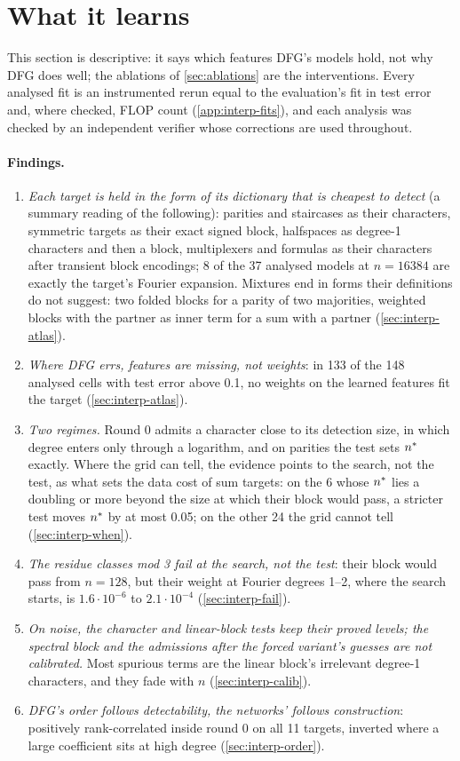 \section{What it learns}\label{sec:interp}

This section is descriptive: it says which features DFG's models hold, not why DFG does well; the ablations of \cref{sec:ablations} are the interventions. Every analysed fit is an instrumented rerun equal to the evaluation's fit in test error and, where checked, FLOP count (\cref{app:interp-fits}), and each analysis was checked by an independent verifier whose corrections are used throughout.

\paragraph{Findings.}
\begin{enumerate}
\item \emph{Each target is held in the form of its dictionary that is cheapest to detect} (a summary reading of the following): parities and staircases as their characters, symmetric targets as their exact signed block, halfspaces as degree-1 characters and then a block, multiplexers and formulas as their characters after transient block encodings; 8 of the 37 analysed models at $n=16384$ are exactly the target's Fourier expansion. Mixtures end in forms their definitions do not suggest: two folded blocks for a parity of two majorities, weighted blocks with the partner as inner term for a sum with a partner (\cref{sec:interp-atlas}).
\item \emph{Where DFG errs, features are missing, not weights}: in 133 of the 148 analysed cells with test error above 0.1, no weights on the learned features fit the target (\cref{sec:interp-atlas}).
\item \emph{Two regimes.} Round 0 admits a character close to its detection size, in which degree enters only through a logarithm, and on parities the test sets $n^{*}$ exactly. Where the grid can tell, the evidence points to the search, not the test, as what sets the data cost of sum targets: on the 6 whose $n^{*}$ lies a doubling or more beyond the size at which their block would pass, a stricter test moves $n^{*}$ by at most 0.05; on the other 24 the grid cannot tell (\cref{sec:interp-when}).
\item \emph{The residue classes mod 3 fail at the search, not the test}: their block would pass from $n=128$, but their weight at Fourier degrees 1--2, where the search starts, is $1.6\cdot10^{-6}$ to $2.1\cdot10^{-4}$ (\cref{sec:interp-fail}).
\item \emph{On noise, the character and linear-block tests keep their proved levels; the spectral block and the admissions after the forced variant's guesses are not calibrated.} Most spurious terms are the linear block's irrelevant degree-1 characters, and they fade with $n$ (\cref{sec:interp-calib}).
\item \emph{DFG's order follows detectability, the networks' follows construction}: positively rank-correlated inside round 0 on all 11 targets, inverted where a large coefficient sits at high degree (\cref{sec:interp-order}).
\end{enumerate}
